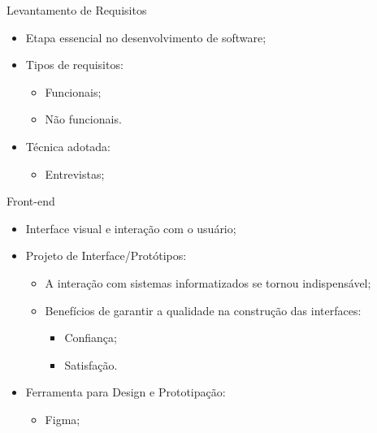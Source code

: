 \begin{frame}{Levantamento de Requisitos}
    \begin{itemize}
        \item Etapa essencial no desenvolvimento de software; \vspace{0.5cm}
        \item Tipos de requisitos: \vspace{0.5cm}
              \begin{itemize}
                  \item Funcionais; \vspace{0.25cm}
                  \item Não funcionais. \vspace{0.5cm}
              \end{itemize}
        \item Técnica adotada: \vspace{0.25cm}
              \begin{itemize}
                  \item Entrevistas; \vspace{0.25cm}
              \end{itemize}
    \end{itemize}
\end{frame}

\begin{frame}{Front-end}
    \begin{itemize}
        \item Interface visual e interação com o usuário; \vspace{0.25cm}
        \item Projeto de Interface/Protótipos: \vspace{0.25cm}
              \begin{itemize}
                  \item A interação com sistemas informatizados se tornou indispensável; \vspace{0.25cm}
                  \item Benefícios de garantir a qualidade na construção das interfaces: \vspace{0.25cm}
                        \begin{itemize}
                            \item Confiança; \vspace{0.25cm}
                            \item Satisfação. \vspace{0.25cm}
                        \end{itemize}
              \end{itemize}
        \item Ferramenta para Design e Prototipação: \vspace{0.25cm}
              \begin{itemize}
                  \item Figma; \vspace{0.25cm}
              \end{itemize}
    \end{itemize}
\end{frame}

